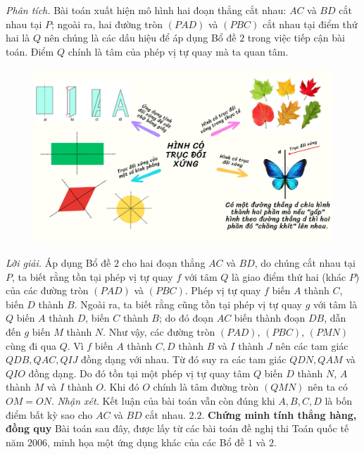 \begin{multicols}{2}
\begin{figure}[H]
		\vspace*{-15pt}
	\end{figure}
	\textit{Phân tích.} Bài toán xuất hiện mô hình hai đoạn thẳng cắt nhau: $AC$ và $BD$ cắt nhau tại $P$; ngoài ra, hai đường tròn $(PAD)$ và $(PBC)$ cắt nhau tại điểm thứ hai là $Q$ nên chúng là các dấu hiệu để áp dụng Bổ đề $2$ trong việc tiếp cận bài toán. Điểm $Q$ chính là tâm của phép vị tự quay mà ta quan tâm.
	\begin{figure}[H]
		\vspace*{-10pt}
		\centering
		\captionsetup{labelformat= empty, justification=centering}
		\includegraphics[width= 0.9\linewidth]{7}
		\vspace*{-10pt}
	\end{figure}
	\textit{Lời giải.} Áp dụng Bổ đề $2$ cho hai đoạn thẳng $AC$ và $BD$, do chúng cắt nhau tại $P$, ta biết rằng tồn tại phép vị tự quay $f$ với tâm $Q$ là giao điểm thứ hai (khác $P$) của các đường tròn $(PAD)$ và $(PBC)$. Phép vị tự quay $f$ biến $A$ thành $C$, biến $D$ thành $B$. Ngoài ra, ta biết rằng cũng tồn tại phép vị tự quay $g$ với tâm là $Q$ biến $A$ thành $D$, biến $C$ thành $B$; do đó đoạn $AC$  biến thành đoạn $DB$, dẫn đến $g$ biến $M$ thành $N$. Như vậy, các đường tròn $(PAD)$, $(PBC)$, $(PMN)$ cùng đi qua $Q$. Vì $f$ biến $A$ thành $C,D$ thành $B$ và $I$ thành $J$ nên các tam giác $QDB,QAC,QIJ$ đồng dạng với nhau. Từ đó suy ra các tam giác $QDN,QAM$ và $QIO$ đồng dạng. Do đó tồn tại một phép vị tự quay tâm $Q$ biến $D$ thành $N$, $A$ thành $M$ và $I$ thành $O$. Khi đó $O$ chính là tâm đường tròn $(QMN)$ nên ta có $OM=ON$.
	\vskip 0.1cm
	\textit{Nhận xét.} Kết luận của bài toán vẫn còn đúng khi $A,B,C,D$ là bốn điểm bất kỳ sao cho $AC$ và $BD$ cắt nhau. 
	\vskip 0.1cm
	$\pmb{2.2.}$ \textbf{\color{diendantoanhoc}Chứng minh tính thẳng hàng, đồng quy}
	\vskip 0.1cm
	Bài toán sau đây, được lấy từ các bài toán đề nghị thi Toán quốc tế năm $2006$, minh họa một ứng dụng khác của các Bổ đề $1$ và $2$.

\end{multicols}
